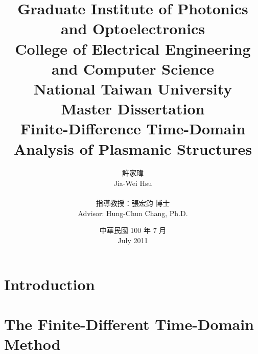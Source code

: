 \documentclass{book}
\begin{document}
\title{
  \rm{Graduate Institute of Photonics and Optoelectronics\\College of Electrical Engineering and Computer Science\\National Taiwan University\\Master Dissertation\\[1cm]}
  \rm{Finite-Difference Time-Domain Analysis of Plasmanic Structures}
}
\author{
  \kai 許家瑋\\ \rm Jia-Wei Hsu\\\\
  \kai 指導教授：張宏鈞 博士\\ \rm Advisor: Hung-Chun Chang, Ph.D.
}
\date{
  \kai 中華民國 100 年 7 月\\ 
  \rm July 2011
}

\maketitle
{}
\tableofcontents


\chapter{Introduction}



\chapter{The Finite-Different Time-Domain Method}



\end{document}

